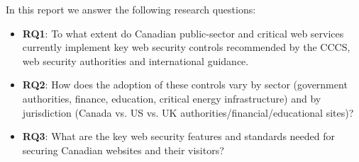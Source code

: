 \documentclass[pdflatex,sn-mathphys-num]{sn-jnl}
\numberwithin{equation}{section}
\theoremstyle{thmstyleone}
\theoremstyle{thmstyletwo}%
\theoremstyle{thmstylethree}%
\begin{document}
 \vspace{1em}In this report we answer the following research questions: 

 \begin{itemize}
     \vspace{0.4em} \item \textbf{RQ1}: To what extent do Canadian public-sector and critical web services 
     currently implement key web security controls recommended by the CCCS, web security authorities and international guidance.
     \vspace{0.4em} \item \textbf{RQ2}: How does the adoption of these controls vary by sector (government authorities, 
     finance, education, critical energy infrastructure) and by jurisdiction (Canada vs. US vs. UK authorities/financial/educational sites)?
     
     \vspace{0.4em} \item \textbf{RQ3}: What are the key web security features and standards needed for securing Canadian websites 
     and their visitors?
 \end{itemize}




\end{document}
